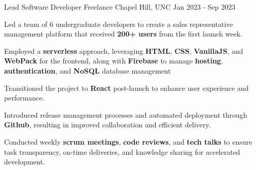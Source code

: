 
\begin{cventries}
  \cventry
    {Lead Software Developer} %
    {Freelance} %
    {Chapel Hill, UNC} %
    {Jan 2023 - Sep 2023} %
    {
      \begin{cvitems} %
        \item {Led a team of 6 undergraduate developers to create a sales representative management platform that received \textbf{200+ users} from the first launch week.}
        \item {Employed a \textbf{serverless} approach, leveraging \textbf{HTML}, \textbf{CSS}, \textbf{VanillaJS}, and \textbf{WebPack} for the frontend, along with \textbf{Firebase} to manage \textbf{hosting}, \textbf{authentication}, and \textbf{NoSQL} database management}
        \item {Transitioned the project to \textbf{React} post-launch to enhance user experience and performance.}
        \item {Introduced release management processes and automated deployment through \textbf{Github}, resulting in improved collaboration and efficient delivery.}
        \item {Conducted weekly \textbf{scrum meetings}, \textbf{code reviews}, and \textbf{tech talks} to ensure task transparency, on-time deliveries, and knowledge sharing for accelerated development.}
      \end{cvitems}
    }


\end{cventries}
